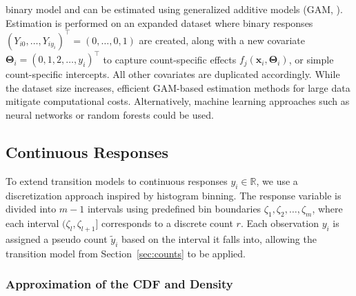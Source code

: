 \documentclass[english,a4paper,11pt]{article}
\begin{document}
binary model and can be estimated using generalized additive models (GAM, \cite{Wood17}).
Estimation is performed on an expanded dataset where binary responses
$(Y_{i0}, \dots, Y_{iy_i})^\top = (0, \dots, 0, 1)$ are created, along with a new
covariate $\boldsymbol{\Theta}_i = (0, 1, 2, \dots, y_i)^\top$ to capture
count-specific effects $f_j(\mathbf{x}_i, \boldsymbol{\Theta}_i)$, or simple count-specific
intercepts. All other covariates are duplicated accordingly.
While the dataset size increases, efficient GAM-based estimation methods for
large data \cite{Wood:2014, Wood:2017} mitigate computational costs. Alternatively, machine
learning approaches such as neural networks or random forests could be used.

\subsection{Continuous Responses} \label{sec:continuous}

To extend transition models to continuous responses $y_i \in \mathbb{R}$, we use a
discretization approach inspired by histogram binning. The response variable is divided
into $m - 1$ intervals using predefined bin boundaries $\zeta_1, \zeta_2, \dots, \zeta_m$,
where each interval $(\zeta_l, \zeta_{l+1}]$ corresponds to a discrete count $r$. Each observation
$y_i$ is assigned a pseudo count $\tilde{y}_i$ based on the interval it falls into, allowing the
transition model from Section~\ref{sec:counts} to be applied.

\subsubsection{Approximation of the CDF and Density}
\end{document}
